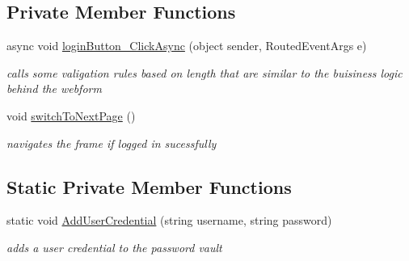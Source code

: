 \subsection*{Private Member Functions}
\begin{DoxyCompactItemize}
\item 
async void \hyperlink{class_listen_to_me_1_1_login_page_a41207ebe789ac6bdf7b789e567fdf837}{login\+Button\+\_\+\+Click\+Async} (object sender, Routed\+Event\+Args e)
\begin{DoxyCompactList}\small\item\em calls some valigation rules based on length that are similar to the buisiness logic behind the webform \end{DoxyCompactList}\item 
void \hyperlink{class_listen_to_me_1_1_login_page_a08d3ad9382e4aa77a5e7781eb393dd10}{switch\+To\+Next\+Page} ()
\begin{DoxyCompactList}\small\item\em navigates the frame if logged in sucessfully \end{DoxyCompactList}\end{DoxyCompactItemize}
\subsection*{Static Private Member Functions}
\begin{DoxyCompactItemize}
\item 
static void \hyperlink{class_listen_to_me_1_1_login_page_af6692799b00ea2ad405a7af8dff73ad3}{Add\+User\+Credential} (string username, string password)
\begin{DoxyCompactList}\small\item\em adds a user credential to the password vault \end{DoxyCompactList}\end{DoxyCompactItemize}
